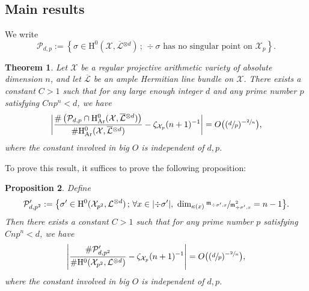 \documentclass[JEP,XML,SOM,Unicode,published]{cedram}
\newcommand{\sep}{\,;\,}
\theoremstyle{plain}
\newtheorem{thm}{Theorem}[section]
\newtheorem{prop}[thm]{Proposition}
\theoremstyle{definition}
\newcommand{\ho}{\mathrm{H}}
\newcommand{\m}{\mathfrak{m}}
\newcommand{\X}{\mathcal{X}}
\newcommand{\Li}{\overline{\mathcal{L}}{}}
\newcommand{\li}{\mathcal{L}}
\begin{document}
\subsection{Main results}
We write
\[
\mathcal{P}_{d,p}:=\left\{ \sigma\in \ho^0(\X, \Li^{\otimes d})\sep \div \sigma \text{ has no singular point on } \X_p \right\}.
\]

\begin{thm}\label{fiber}
Let $\X$ be a regular projective arithmetic variety of absolute dimension $n$, and let $\Li$ be an ample Hermitian line bundle on $\X$.
There exists a constant $C>1$ such that for any large enough integer $d$ and any prime number $p$ satisfying $Cnp^n<d$, we have
\[
\biggl| \frac{\#\left(\mathcal{P}_{d,p} \cap \ho^0_{\mathrm{Ar}}(\X, \overline{\mathcal{L}}{}^{\otimes d})\right)}{\#\ho^0_{\mathrm{Ar}}(\X, \overline{\mathcal{L}}{}^{\otimes d})} -\zeta_{\X_p}(n+1)^{-1} \biggr|=O\bigl((\sfrac{d}{p})^{-\sfrac{2}{n}} \bigr),
\]
where the constant involved in big $O$ is independent of $d,p$.
\end{thm}

To prove this result, it suffices to prove the following proposition:

\begin{prop}\label{fib}
Define
\[
\mathcal{P}'_{d,p^2}:=\bigl\{ \sigma'\in \ho^0(\X_{p^2}, \li^{\otimes d})\sep \forall x\in |{\div\sigma'}|,\ \dim_{\kappa(x)}\sfrac{\m_{\div \sigma',x}}{\m^2_{\div \sigma', x}}=n-1 \bigr\}.
\]
Then there exists a constant $C>1$ such that for any prime number $p$ satisfying $Cnp^n<d$, we have
\[
\left| \frac{\#\mathcal{P}'_{d,p^2}}{\#\ho^0(\X_{p^2}, \li^{\otimes d})} -\zeta_{\X_p}(n+1)^{-1} \right|=O\bigl((\sfrac{d}{p})^{-\sfrac{2}{n}} \bigr),
\]
where the constant involved in big $O$ is independent of $d,p$.
\end{prop}
\end{document}
